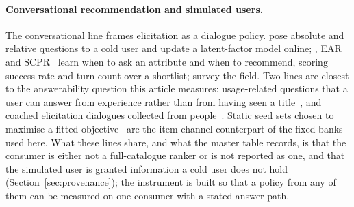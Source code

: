 \documentclass[manuscript,screen]{acmart}
\begin{document}
\paragraph{Conversational recommendation and simulated users.} The conversational line frames elicitation as a dialogue policy. \citet{christakopoulou2016towards} pose absolute and relative questions to a cold user and update a latent-factor model online; \citet{sun2018conversational}, EAR~\citep{lei2020estimation} and SCPR~\citep{lei2020interactive} learn when to ask an attribute and when to recommend, scoring success rate and turn count over a shortlist; \citet{jannach2021survey} survey the field. Two lines are closest to the answerability question this article measures: usage-related questions that a user can answer from experience rather than from having seen a title~\citep{kostric2024generating}, and coached elicitation dialogues collected from people~\citep{radlinski2019coached}. Static seed sets chosen to maximise a fitted objective~\citep{golbandi2010bootstrapping} are the item-channel counterpart of the fixed banks used here. What these lines share, and what the master table records, is that the consumer is either not a full-catalogue ranker or is not reported as one, and that the simulated user is granted information a cold user does not hold (Section~\ref{sec:provenance}); the instrument is built so that a policy from any of them can be measured on one consumer with a stated answer path.
\end{document}
